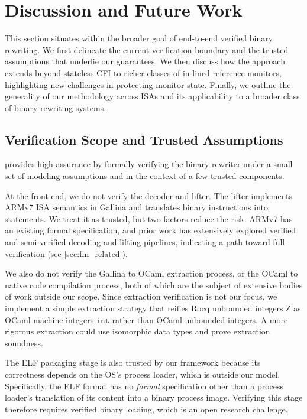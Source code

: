 
\section{Discussion and Future Work}\label{sec:disc}
{%
    This section situates \pname within the broader goal of end-to-end verified binary rewriting. We first delineate the current verification boundary and the trusted assumptions that underlie our guarantees. We then discuss how the approach extends beyond stateless CFI to richer classes of in-lined reference monitors, highlighting new challenges in protecting monitor state. Finally, we outline the generality of our methodology across ISAs and its applicability to a broader class of binary rewriting systems.
}

\subsection{Verification Scope and Trusted Assumptions}\label{sec:elf_packager_fm}

\pname provides high assurance by formally verifying the binary rewriter under a small set of modeling assumptions and in the context of a few trusted components.

At the front end, we do not verify the decoder and lifter. The lifter implements ARMv7 ISA semantics in Gallina and translates binary instructions into \Picinae \IL statements. We treat it as trusted, but two factors reduce the risk: ARMv7 has an existing formal specification, and prior work has extensively explored verified and semi-verified decoding and lifting pipelines, indicating a path toward full verification (see \autoref{sec:fm_related}).

We also do not verify the Gallina to OCaml extraction process, or the OCaml to native code compilation process, both of which are the subject of extensive bodies of work outside our scope.
Since extraction verification is not our focus, we implement a simple extraction strategy that reifies Rocq unbounded integers $\mathsf{Z}$ as OCaml machine integers $\mathtt{int}$ rather than OCaml unbounded integers.
A more rigorous extraction could use isomorphic data types and prove extraction soundness.

The ELF packaging stage is also trusted by our framework because its correctness depends on the OS's process loader, which is outside our model.
Specifically, the ELF format has no \emph{formal} specification other than a process loader's translation of its content into a binary process image.
Verifying this stage therefore requires verified binary loading, which is an open research challenge.

